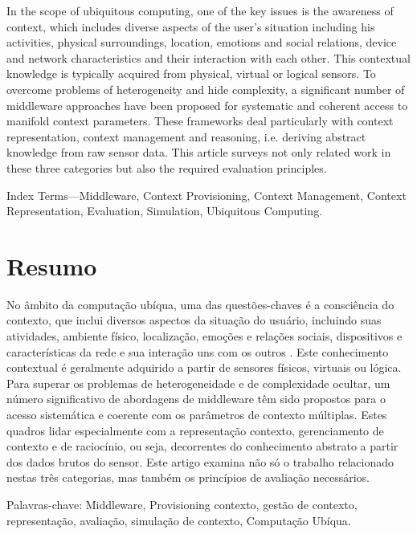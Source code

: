 \documentclass[12pt]{article} %
\begin{document}
In the scope of ubiquitous computing, one of the key issues is the awareness of context, which includes diverse aspects of the user’s situation including his activities, physical surroundings, location, emotions and social relations, device and network characteristics and their interaction with each other. This contextual knowledge is typically acquired from physical, virtual or logical sensors. To overcome problems of heterogeneity and hide complexity, a significant number of middleware approaches have been proposed for systematic and coherent access to manifold context parameters. These frameworks deal particularly with context representation, context management and reasoning, i.e. deriving abstract knowledge from raw sensor data. This article surveys not only related work in these three categories but also the required evaluation principles.

Index Terms—Middleware, Context Provisioning, Context Management, Context Representation, Evaluation, Simulation, Ubiquitous Computing.



\section{Resumo} %

No âmbito da computação ubíqua, uma das questões-chaves é a consciência do contexto, que inclui diversos aspectos da situação do usuário, incluindo suas atividades, ambiente físico, localização, emoções e relações sociais, dispositivos e características da rede e sua interação uns com os outros . Este conhecimento contextual é geralmente adquirido a partir de sensores físicos, virtuais ou lógica. Para superar os problemas de heterogeneidade e de complexidade ocultar, um número significativo de abordagens de middleware têm sido propostos para o acesso sistemática e coerente com os parâmetros de contexto múltiplas. Estes quadros lidar especialmente com a representação contexto, gerenciamento de contexto e de raciocínio, ou seja, decorrentes do conhecimento abstrato a partir dos dados brutos do sensor. Este artigo examina não só o trabalho relacionado nestas três categorias, mas também os princípios de avaliação necessários.

Palavras-chave: Middleware, Provisioning contexto, gestão de contexto, representação, avaliação, simulação de contexto, Computação Ubíqua.
\end{document}
